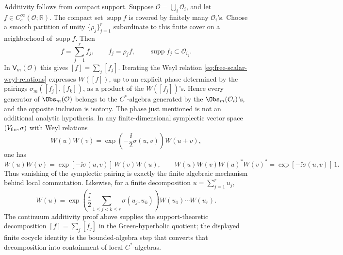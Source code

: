 Additivity follows from compact support.  Suppose
\(\mathcal O=\bigcup_i\mathcal O_i\), and let
\(f\in C_c^\infty(\mathcal O;\mathbb R)\).  The compact set
\(\operatorname{supp}f\) is covered by finitely many \(\mathcal O_i\)'s.
Choose a smooth partition of unity \(\{\rho_j\}_{j=1}^r\) subordinate to this
finite cover on a neighborhood of \(\operatorname{supp}f\).  Then
\[
  f=\sum_{j=1}^r f_j,\qquad f_j=\rho_j f,\qquad
  \operatorname{supp}f_j\subset\mathcal O_{i_j}.
\]
In \(\mathsf V_m(\mathcal O)\) this gives
\([f]=\sum_j[f_j]\).  Iterating the Weyl relation
\eqref{eq:free-scalar-weyl-relations} expresses \(W([f])\), up to an
explicit phase determined by the pairings
\(\sigma_m([f_j],[f_k])\), as a product of the \(W([f_j])\)'s.  Hence every
generator of \(\Obs_m(\mathcal O)\) belongs to the \(C^*\)-algebra generated
by the \(\Obs_m(\mathcal O_i)\)'s, and the opposite inclusion is isotony.
The phase just mentioned is not an additional analytic hypothesis.  In any
finite-dimensional symplectic vector space \((V_{\rm fin},\sigma)\) with Weyl
relations
\[
  W(u)W(v)=\exp\!\left(-\frac{\ii}{2}\sigma(u,v)\right)W(u+v),
\]
one has
\[
  W(u)W(v)=\exp[-\ii\sigma(u,v)]\,W(v)W(u),
  \qquad
  W(u)W(v)W(u)^*W(v)^*
  =
  \exp[-\ii\sigma(u,v)]\,1.
\]
Thus vanishing of the symplectic pairing is exactly the finite algebraic
mechanism behind local commutation.  Likewise, for a finite decomposition
\(u=\sum_{j=1}^r u_j\),
\[
  W(u)
  =
  \exp\!\left(\frac{\ii}{2}\sum_{1\le j<k\le r}\sigma(u_j,u_k)\right)
  W(u_1)\cdots W(u_r).
\]
The continuum additivity proof above supplies the support-theoretic
decomposition \( [f]=\sum_j[f_j]\) in the Green-hyperbolic quotient; the
displayed finite cocycle identity is the bounded-algebra step that converts
that decomposition into containment of local \(C^*\)-algebras.


